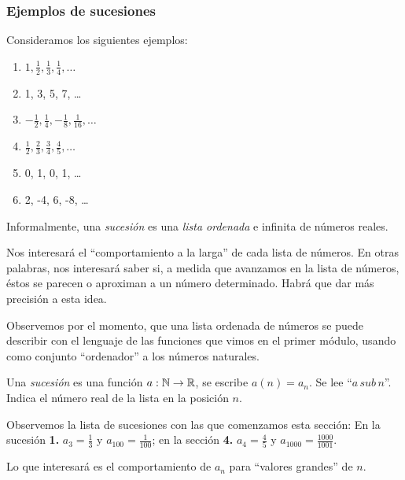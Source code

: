 \documentclass[../Teoría.root.tex]{subfiles}
\begin{document}
\subsubsection{Ejemplos de sucesiones}
Consideramos los siguientes ejemplos:
\begin{enumerate}
    \item \(1,\frac{1}{2},\frac{1}{3},\frac{1}{4},\dots\)
    \item 1, 3, 5, 7, \dots
    \item \(-\frac{1}{2},\frac{1}{4},-\frac{1}{8},\frac{1}{16},\dots\)
    \item \(\frac{1}{2},\frac{2}{3},\frac{3}{4},\frac{4}{5},\dots\)
    \item 0, 1, 0, 1, \dots
    \item 2, -4, 6, -8, \dots
\end{enumerate}
Informalmente, una \textit{sucesión} es una \textit{lista ordenada} e infinita de números reales.

Nos interesará el “comportamiento a la larga” de cada lista de números.
En otras palabras, nos interesará saber si, a medida que avanzamos en la lista de números, éstos se parecen o aproximan a un número determinado.
Habrá que dar más precisión a esta idea.

Observemos por el momento, que una lista ordenada de números se puede describir con el lenguaje de las funciones que vimos en el primer módulo, usando como conjunto “ordenador” a los números naturales.

Una \textit{sucesión} es una función \(a:\mathbb{N}\rightarrow\mathbb{R}\), se escribe \(a(n)=a_n\).
Se lee “\(a\,sub\,n\)”.
Indica el número real de la lista en la posición \(n\).

Observemos la lista de sucesiones con las que comenzamos esta sección:
En la sucesión \textbf{1.} \(a_3=\frac{1}{3}\) y \(a_{100}=\frac{1}{100}\); en la sección \textbf{4.} \(a_4=\frac{4}{5}\) y \(a_{1000}=\frac{1000}{1001}\).

Lo que interesará es el comportamiento de \(a_n\) para “valores grandes” de \(n\).
\end{document}
